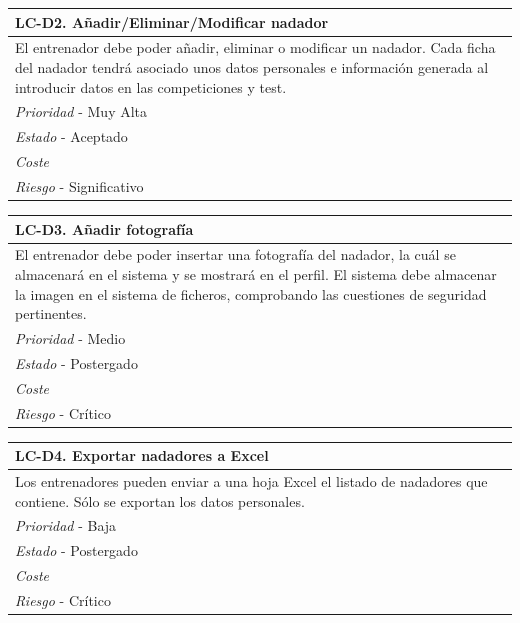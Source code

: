 	\begin{center}
		\begin{tabularx}{15cm}{|X|}
			\hline 
				\bf{LC-D2. Añadir/Eliminar/Modificar nadador}\\
			\hline
				El entrenador debe poder añadir, eliminar o modificar un nadador. Cada ficha del nadador tendrá asociado unos datos personales e información generada al introducir datos en las competiciones y test.\\
			\hline
				{\it Prioridad} - Muy Alta\\
			\hline
				{\it Estado} - Aceptado\\
			\hline
				{\it Coste}\\
			\hline
				{\it Riesgo} - Significativo\\
			\hline
		\end{tabularx}
	\end{center}
	
	\begin{center}
		\begin{tabularx}{15cm}{|X|}
			\hline 
				\bf{LC-D3. Añadir fotografía}\\
			\hline
				El entrenador debe poder insertar una fotografía del nadador, la cuál se almacenará en el sistema y se mostrará en el perfil. El sistema debe almacenar la imagen en el sistema de ficheros, comprobando las cuestiones de seguridad pertinentes.\\
			\hline
				{\it Prioridad} - Medio\\
			\hline
				{\it Estado} - Postergado\\
			\hline
				{\it Coste}\\
			\hline
				{\it Riesgo} - Crítico\\
			\hline
		\end{tabularx}
	\end{center}
	
	\begin{center}
		\begin{tabularx}{15cm}{|X|}
			\hline 
				\bf{LC-D4. Exportar nadadores a Excel}\\
			\hline
				Los entrenadores pueden enviar a una hoja Excel el listado de nadadores que contiene. Sólo se exportan los datos personales.\\
			\hline
				{\it Prioridad} - Baja\\
			\hline
				{\it Estado} - Postergado\\
			\hline
				{\it Coste}\\
			\hline
				{\it Riesgo} - Crítico\\
			\hline
		\end{tabularx}
	\end{center}
	
